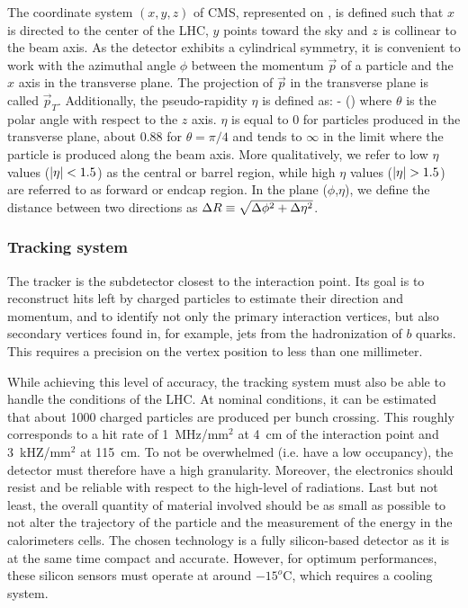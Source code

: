     The coordinate system $(x,y,z)$ of CMS, represented on ,
    is defined such that $x$ is directed to the center of the LHC, $y$ points toward
    the sky and $z$ is collinear to the beam axis. As the detector exhibits a
    cylindrical symmetry, it is convenient to work with the azimuthal angle $\phi$
    between the momentum $\vec{p}$ of a particle and the $x$ axis in the transverse
    plane. The projection of $\vec{p}$ in the transverse plane is called $\vec{p}_T$.
    Additionally, the pseudo-rapidity $\eta$ is defined as:
    {
        \eta {} - ()
    }
    where $\theta$ is the polar angle with respect to the $z$ axis. $\eta$ is equal
    to 0 for particles produced in
    the transverse plane, about 0.88 for $\theta = \pi/4$ and tends to $\infty$ in the
    limit where the particle is produced along the beam axis. More qualitatively, we
    refer to low $\eta$ values ($\left| \eta \right| < 1.5$) as the central or barrel region, while
    high $\eta$ values ($\left| \eta \right| > 1.5$) are referred to as forward or endcap region.
    In the plane ($\phi$,$\eta$), we define the distance between two directions as
    $\Delta R \equiv \sqrt{\Delta\phi^2 + \Delta \eta^2}$.


        \subsubsection{Tracking system}

    The tracker is the subdetector closest to the interaction point. Its goal
    is to reconstruct hits left by charged particles to estimate their direction
    and momentum, and to identify not only the primary interaction vertices, but also
    secondary vertices found in, for example, jets from the hadronization of $b$ quarks.
    This requires a precision on the vertex position to less than one millimeter.

    While achieving this level of accuracy, the tracking system must also be able to handle the conditions of
    the LHC. At nominal conditions, it can be estimated that about 1000 charged particles
    are produced per bunch crossing. This roughly corresponds to a
    hit rate of 1~MHz/mm$^2$ at 4~cm of the interaction point and 3~kHZ/mm$^2$ at 115~cm.
    To not be overwhelmed (i.e. have a low occupancy), the detector must therefore
    have a high granularity. Moreover, the electronics should resist and be reliable
    with respect to the high-level of radiations. Last but not least, the overall
    quantity of material involved should be as small as possible to not alter the
    trajectory of the particle and the measurement of the energy in the calorimeters
    cells. The chosen technology is a fully silicon-based detector as it is at the
    same time compact and accurate. However, for optimum performances, these silicon
    sensors must operate at around $-15^o$C, which requires a cooling system.

